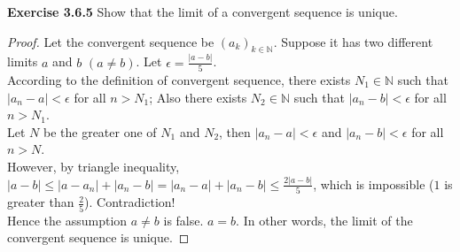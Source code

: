 \documentclass[12pt]{article}
\newcommand{\bbN}{\mathbb{N}}
\theoremstyle{definition}
\numberwithin{equation}{subsection}
\begin{document}
\textbf{Exercise 3.6.5} Show that the limit of a convergent sequence is unique.
\begin{proof}
Let the convergent sequence be $(a_k)_{k\in \bbN}$.
Suppose it has two different limits $a$ and $b$ $(a \neq b)$.
Let $\epsilon = \frac{|a-b|}{5}$.\\
According to the definition of convergent sequence, there exists $N_1 \in \bbN$ such that
$|a_n - a| < \epsilon$ for all $n > N_1$;
Also
there exists $N_2 \in \bbN$ such that
$|a_n - b| < \epsilon$ for all $n > N_1$.\\
Let $N$ be the greater one of $N_1$ and $N_2$, then
$|a_n - a| < \epsilon$ and
$|a_n - b| < \epsilon$ for all $n > N$.\\
However, by triangle inequality, $|a-b| \leq |a-a_n|+|a_n-b| = |a_n-a|+|a_n-b| \leq \frac{2|a-b|}{5}$, which is impossible ($1$ is greater than $\frac{2}{5}$). Contradiction! \\Hence the assumption $a\neq b$ is false. $a=b$. In other words, the limit of the convergent sequence is unique.
\end{proof}
\end{document}
